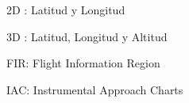 2D : Latitud y Longitud

3D : Latitud, Longitud y Altitud

FIR: Flight Information Region

IAC: Instrumental Approach Charts




